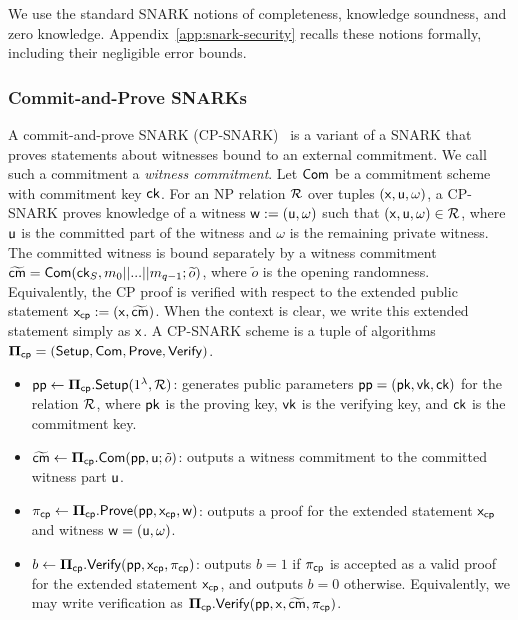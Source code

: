 \begin{remark}
We use the standard SNARK notions of completeness, knowledge soundness, and
zero knowledge.  Appendix~\ref{app:snark-security} recalls these notions
formally, including their negligible error bounds. 
\end{remark}


\subsubsection{Commit-and-Prove SNARKs}
A commit-and-prove SNARK (CP-SNARK)~\cite{gnark, legosnark} is a variant of a SNARK that proves statements about witnesses bound to an external commitment. We call such a commitment a \emph{witness commitment}. Let ${\sf Com}$ be a commitment scheme with commitment key ${\textsf{ck}}$. For an NP relation ${\mathcal{R}}$ over tuples $(\mathsf{x},\mathsf{u},\omega)$, a CP-SNARK proves knowledge of a witness
$\mathsf{w} := (\mathsf{u},\omega)$ such that $(\mathsf{x},\mathsf{u},\omega)\in{\mathcal{R}}$,
where $\mathsf{u}$ is the committed part of the witness and $\omega$ is the
remaining private witness.  The committed witness is bound separately by a
witness commitment
$\widetilde{\textsf{cm}} = {\sf Com}({\textsf{ck}}_S, m_0 || ... || m_{q-1}; \widetilde{o})$, where $\tilde{o}$ is the
opening randomness.  Equivalently, the CP proof is verified with respect to the
extended public statement $\mathsf{x}_{{\mathsf{cp}}}:=(\mathsf{x},\widetilde{\textsf{cm}})$.  When the
context is clear, we write this extended statement simply as $\mathsf{x}$.
A CP-SNARK scheme is a tuple of algorithms
${\bf \Pi}_{{\mathsf{cp}}}=({\sf Setup},{\sf Com},{\sf Prove},{\sf Verify})$.

\begin{itemize}
    \item $\textsf{pp} \gets {\bf \Pi}_{{\mathsf{cp}}}.{\sf Setup}(1^\lambda,{\mathcal{R}})$: generates public parameters $\textsf{pp}=({\textsf{pk}},{\textsf{vk}},{\textsf{ck}})$ for the relation ${\mathcal{R}}$, where ${\textsf{pk}}$ is the proving key, ${\textsf{vk}}$ is the verifying key, and ${\textsf{ck}}$ is the commitment key.

    \item $\widetilde{\textsf{cm}} \gets {\bf \Pi}_{{\mathsf{cp}}}.{\sf Com}(\textsf{pp},\mathsf{u};\tilde{o})$:
    outputs a witness commitment to the committed witness part $\mathsf{u}$.

    \item $\pi_{{\mathsf{cp}}} \gets {\bf \Pi}_{{\mathsf{cp}}}.{\sf Prove}(\textsf{pp},\mathsf{x}_{{\mathsf{cp}}},\mathsf{w})$:
    outputs a proof for the extended statement $\mathsf{x}_{{\mathsf{cp}}}$ and witness
    $\mathsf{w}=(\mathsf{u},\omega)$.

    \item $b \gets {\bf \Pi}_{{\mathsf{cp}}}.{\sf Verify}(\textsf{pp},\mathsf{x}_{{\mathsf{cp}}},\pi_{{\mathsf{cp}}})$:
    outputs $b=1$ if $\pi_{{\mathsf{cp}}}$ is accepted as a valid proof for the extended
    statement $\mathsf{x}_{{\mathsf{cp}}}$, and outputs $b=0$ otherwise. Equivalently, we may
    write verification as
    ${\bf \Pi}_{{\mathsf{cp}}}.{\sf Verify}(\textsf{pp},\mathsf{x},\widetilde{\textsf{cm}},\pi_{{\mathsf{cp}}})$.
\end{itemize}
